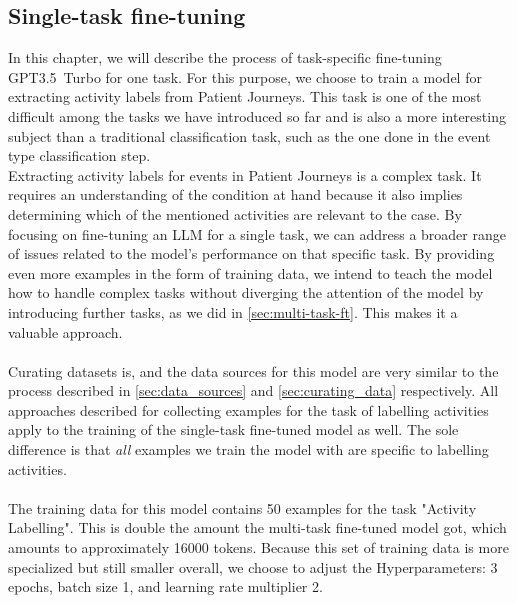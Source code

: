 \subsection{Single-task fine-tuning}\label{sec:single-task-ft}
In this chapter, we will describe the process of task-specific fine-tuning GPT3.5~Turbo for one task. For this purpose, we choose to train a model for extracting activity labels from Patient Journeys. This task is one of the most difficult among the tasks we have introduced so far and is also a more interesting subject than a traditional classification task, such as the one done in the event type classification step.\\
Extracting activity labels for events in Patient Journeys is a complex task. It requires an understanding of the condition at hand because it also implies determining which of the mentioned activities are relevant to the case. By focusing on fine-tuning an LLM for a single task, we can address a broader range of issues related to the model's performance on that specific task. By providing even more examples in the form of training data, we intend to teach the model how to handle complex tasks without diverging the attention of the model by introducing further tasks, as we did in \autoref{sec:multi-task-ft}. This makes it a valuable approach.\\\\
Curating datasets is, and the data sources for this model are very similar to the process described in \autoref{sec:data_sources} and \autoref{sec:curating_data} respectively. All approaches described for collecting examples for the task of labelling activities apply to the training of the single-task fine-tuned model as well. The sole difference is that \emph{all} examples we train the model with are specific to labelling activities.\\\\
The training data for this model contains 50 examples for the task "Activity Labelling". This is double the amount the multi-task fine-tuned model got, which amounts to approximately 16000 tokens. Because this set of training data is more specialized but still smaller overall, we choose to adjust the Hyperparameters: 3 epochs, batch size 1, and learning rate multiplier 2.

